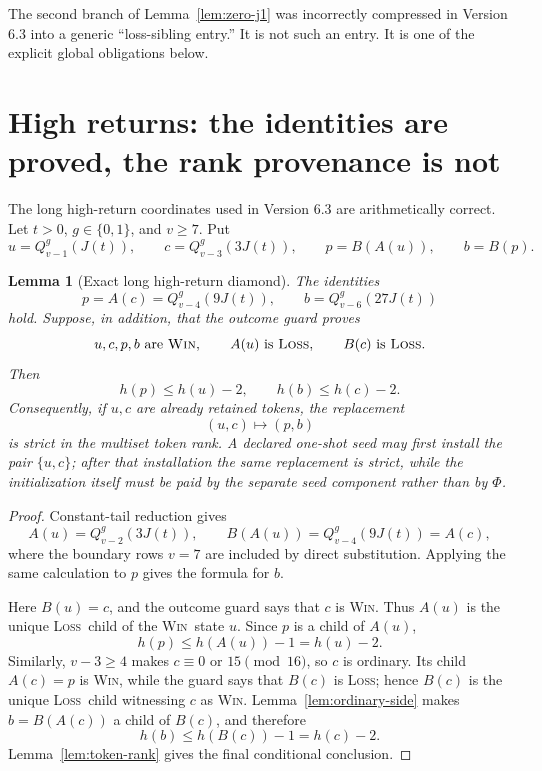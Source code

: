 \documentclass[11pt,a4paper]{article}
\newtheorem{lemma}[theorem]{Lemma}
\theoremstyle{definition}
\theoremstyle{remark}
\newcommand{\WIN}{\textnormal{\textsc{Win}}}
\newcommand{\LOSS}{\textnormal{\textsc{Loss}}}
\begin{document}
The second branch of Lemma~\ref{lem:zero-j1} was incorrectly compressed in
Version 6.3 into a generic ``loss-sibling entry.''  It is not such an entry.
It is one of the explicit global obligations below.

\section{High returns: the identities are proved, the rank provenance is not}

The long high-return coordinates used in Version 6.3 are arithmetically
correct.  Let $t>0$, $g\in\{0,1\}$, and $v\ge7$.  Put
\[
 u=Q_{v-1}^g(J(t)),
 \qquad
 c=Q_{v-3}^g(3J(t)),
 \qquad
 p=B(A(u)),
 \qquad
 b=B(p).
\]

\begin{lemma}[Exact long high-return diamond]\label{lem:high-return}
The identities
\[
 p=A(c)=Q_{v-4}^g(9J(t)),
 \qquad
 b=Q_{v-6}^g(27J(t))
\]
hold.  Suppose, in addition, that the outcome guard proves
\[
 u,c,p,b\text{ are \WIN},
 \qquad A(u)\text{ is \LOSS},
 \qquad B(c)\text{ is \LOSS}.
\]
Then
\[
 h(p)\le h(u)-2,
 \qquad
 h(b)\le h(c)-2.
\]
Consequently, if $u,c$ are already retained tokens, the replacement
\[
  (u,c)\longmapsto(p,b)
\]
is strict in the multiset token rank.  A declared one-shot seed may first
install the pair $\{u,c\}$; after that installation the same replacement
is strict, while the initialization itself must be paid by the separate
seed component rather than by $\Phi$.
\end{lemma}

\begin{proof}
Constant-tail reduction gives
\[
 A(u)=Q_{v-2}^g(3J(t)),
 \qquad
 B(A(u))=Q_{v-4}^g(9J(t))=A(c),
\]
where the boundary rows $v=7$ are included by direct substitution.  Applying
the same calculation to $p$ gives the formula for $b$.

Here $B(u)=c$, and the outcome guard says that $c$ is \WIN.  Thus
$A(u)$ is the unique \LOSS\ child of the \WIN\ state $u$.  Since $p$ is a
child of $A(u)$,
\[
 h(p)\le h(A(u))-1=h(u)-2.
\]
Similarly, $v-3\ge4$ makes $c\equiv0$ or $15\pmod {16}$, so $c$ is
ordinary.  Its child $A(c)=p$ is \WIN, while the guard says that $B(c)$ is
\LOSS; hence $B(c)$ is the unique \LOSS\ child witnessing $c$ as \WIN.
Lemma~\ref{lem:ordinary-side} makes $b=B(A(c))$ a child of $B(c)$, and
therefore
\[
 h(b)\le h(B(c))-1=h(c)-2.
\]
Lemma~\ref{lem:token-rank} gives the final conditional conclusion.
\end{proof}
\end{document}
